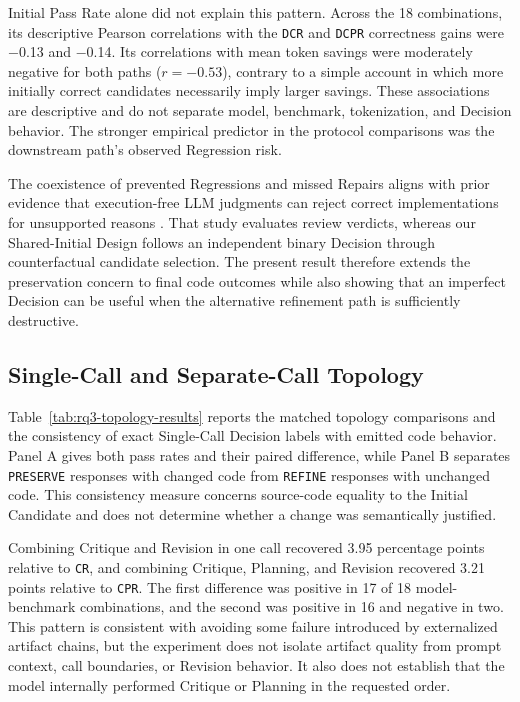 Initial Pass Rate alone did not explain this pattern.
Across the 18 combinations, its descriptive Pearson correlations with the \texttt{DCR} and \texttt{DCPR} correctness gains were $-$0.13 and $-$0.14.
Its correlations with mean token savings were moderately negative for both paths ($r=-0.53$), contrary to a simple account in which more initially correct candidates necessarily imply larger savings.
These associations are descriptive and do not separate model, benchmark, tokenization, and Decision behavior.
The stronger empirical predictor in the protocol comparisons was the downstream path's observed Regression risk.

The coexistence of prevented Regressions and missed Repairs aligns with prior evidence that execution-free LLM judgments can reject correct implementations for unsupported reasons \cite{jin2026reliable}.
That study evaluates review verdicts, whereas our Shared-Initial Design follows an independent binary Decision through counterfactual candidate selection.
The present result therefore extends the preservation concern to final code outcomes while also showing that an imperfect Decision can be useful when the alternative refinement path is sufficiently destructive.

\subsection{Single-Call and Separate-Call Topology}

Table~\ref{tab:rq3-topology-results} reports the matched topology comparisons and the consistency of exact Single-Call Decision labels with emitted code behavior.
Panel A gives both pass rates and their paired difference, while Panel B separates \texttt{PRESERVE} responses with changed code from \texttt{REFINE} responses with unchanged code.
This consistency measure concerns source-code equality to the Initial Candidate and does not determine whether a change was semantically justified.



Combining Critique and Revision in one call recovered 3.95 percentage points relative to \texttt{CR}, and combining Critique, Planning, and Revision recovered 3.21 points relative to \texttt{CPR}.
The first difference was positive in 17 of 18 model-benchmark combinations, and the second was positive in 16 and negative in two.
This pattern is consistent with avoiding some failure introduced by externalized artifact chains, but the experiment does not isolate artifact quality from prompt context, call boundaries, or Revision behavior.
It also does not establish that the model internally performed Critique or Planning in the requested order.

